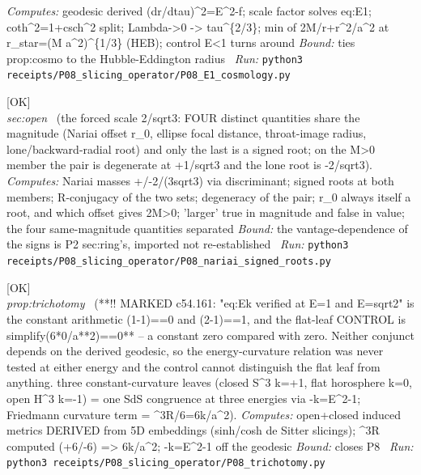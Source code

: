 \begin{description}
\emph{Computes:} geodesic derived (dr/dtau)\textasciicircum{}2=E\textasciicircum{}2-f; scale factor solves eq:E1; coth\textasciicircum{}2=1+csch\textasciicircum{}2 split; Lambda->0 -> tau\textasciicircum{}\{2/3\}; min of 2M/r+r\textasciicircum{}2/a\textasciicircum{}2 at r\_star=(M a\textasciicircum{}2)\textasciicircum{}\{1/3\} (HEB); control E<1 turns around
 \emph{Bound:} ties prop:cosmo to the Hubble-Eddington radius
\ \emph{Run:} \texttt{python3 receipts/P08\_slicing\_operator/P08\_E1\_cosmology.py}
\item[\label{rcpt:P08_nariai_signed_roots}\texttt{P08\_nariai\_signed\_roots}]\hfill\textsf{[OK]}\\
\textit{sec:open} \ (the forced scale 2/sqrt3: FOUR distinct quantities share the magnitude (Nariai offset \textbar{}r\_0\textbar{}, ellipse focal distance, throat-image radius, lone/backward-radial root) and only the last is a signed root; on the M>0 member the pair is degenerate at +1/sqrt3 and the lone root is -2/sqrt3). 
\emph{Computes:} Nariai masses +/-2/(3sqrt3) via discriminant; signed roots at both members; R-conjugacy of the two sets; degeneracy of the pair; r\_0 always itself a root, and which offset gives 2M>0; 'larger' true in magnitude and false in value; the four same-magnitude quantities separated
 \emph{Bound:} the vantage-dependence of the signs is P2 sec:ring's, imported not re-established
\ \emph{Run:} \texttt{python3 receipts/P08\_slicing\_operator/P08\_nariai\_signed\_roots.py}
\item[\label{rcpt:P08_trichotomy}\texttt{P08\_trichotomy}]\hfill\textsf{[OK]}\\
\textit{prop:trichotomy} \ (**!! MARKED c54.161: "eq:Ek verified at E=1 and E=sqrt2" is the constant arithmetic (1-1)==0 and (2-1)==1, and the flat-leaf CONTROL is simplify(6*0/a**2)==0** -- a constant zero compared with zero. Neither conjunct depends on the derived geodesic, so the energy-curvature relation was never tested at either energy and the control cannot distinguish the flat leaf from anything. three constant-curvature leaves (closed S\textasciicircum{}3 k=+1, flat horosphere k=0, open H\textasciicircum{}3 k=-1) = one SdS congruence at three energies via -k=E\textasciicircum{}2-1; Friedmann curvature term = \textasciicircum{}3R/6=6k/a\textasciicircum{}2). 
\emph{Computes:} open+closed induced metrics DERIVED from 5D embeddings (sinh/cosh de Sitter slicings); \textasciicircum{}3R computed (+6/-6) => 6k/a\textasciicircum{}2; -k=E\textasciicircum{}2-1 off the geodesic
 \emph{Bound:} closes P8
\ \emph{Run:} \texttt{python3 receipts/P08\_slicing\_operator/P08\_trichotomy.py}

\end{description}
